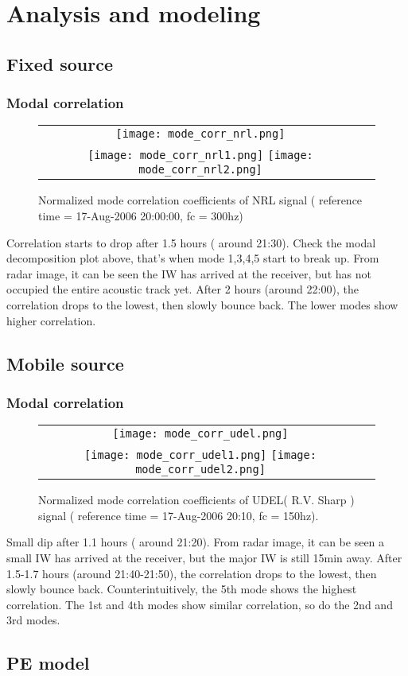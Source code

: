 \chapter{Analysis and modeling}
\section{Fixed source}
\subsection{Modal correlation}
\begin{figure}[h]
  \centering
  \begin{tabular}{cc}
  \texttt{[image: mode\_corr\_nrl.png]}\\
  \texttt{[image: mode\_corr\_nrl1.png]}
  \texttt{[image: mode\_corr\_nrl2.png]}
  \end{tabular}
  \caption{Normalized mode correlation coefficients of NRL signal ( reference time = 17-Aug-2006 20:00:00, fc = 300hz) }\label{fig:mc_1}
\end{figure}

Correlation starts to drop after 1.5 hours ( around 21:30). Check the modal decomposition plot above, that's when mode 1,3,4,5 start to break up. From radar image, it can be seen the IW has arrived at the receiver, but has not occupied the entire acoustic track yet. After 2 hours (around 22:00), the correlation drops to the lowest, then slowly bounce back. The lower modes show higher correlation.
\section{Mobile source} \subsection{Modal correlation}
\begin{figure}[h]
  \centering
  \begin{tabular}{cc}
  \texttt{[image: mode\_corr\_udel.png]}\\
  \texttt{[image: mode\_corr\_udel1.png]}
  \texttt{[image: mode\_corr\_udel2.png]}
  \end{tabular}
  \caption{Normalized mode correlation coefficients of UDEL( R.V. Sharp ) signal ( reference time = 17-Aug-2006 20:10, fc = 150hz).}\label{fig:mc_2}
\end{figure}
Small dip after 1.1 hours ( around 21:20). From radar image, it can be seen a small IW has arrived at the receiver, but the major IW is still 15min away. After 1.5-1.7 hours (around 21:40-21:50), the correlation drops to the lowest, then slowly bounce back. Counterintuitively, the 5th mode shows the highest correlation. The 1st and 4th modes show similar correlation, so do the 2nd and 3rd modes.

\section{PE model}
